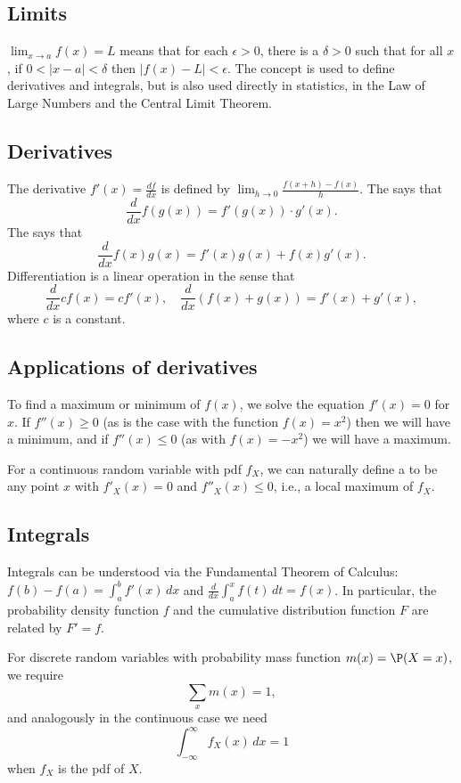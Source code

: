\label{calculus}

\subsection{Limits}

$\lim_{x\to a}f(x)=L$ means that for each $\epsilon>0$, there is a $\delta>0$ such that for all $x$, if $0<|x-a|<\delta$ then $|f(x)-L|<\epsilon$.
The concept is used to define derivatives and integrals, but is also used directly in statistics, in the Law of Large Numbers and the Central Limit Theorem.

\subsection{Derivatives}

	The derivative $f'(x)=\frac{df}{dx}$ is defined by $\lim_{h\to 0}\frac{f(x+h)-f(x)}h$. The  says that
	\[
		\frac{d}{dx}f(g(x))=f'(g(x))\cdot g'(x).
	\]
	The  says that
	\[
		\frac{d}{dx} f(x)g(x) = f'(x)g(x)+f(x)g'(x).
	\]
	Differentiation is a linear operation in the sense that
	\[
		\frac{d}{dx} cf(x)=cf'(x),\quad \frac{d}{dx}(f(x)+g(x)) = f'(x)+g'(x),
	\]
	where $c$ is a constant.

\subsection{Applications of derivatives}%

	To find a maximum or minimum of $f(x)$, we solve the equation $f'(x)=0$ for $x$.
	If $f''(x)\ge 0$ (as is the case with the function $f(x)=x^2$) then we will have a minimum,
	and if $f''(x)\le 0$ (as with $f(x)=-x^2$) we will have a maximum.

	For a continuous random variable with pdf $f_X$, we can naturally define a  to be
	any point $x$ with $f'_X(x)=0$ and $f''_X(x)\le 0$, i.e., a local maximum of $f_X$.

\subsection{Integrals}
	Integrals can be understood via the Fundamental Theorem of Calculus: $f(b)-f(a)=\int_a^b f'(x)\,dx$ and $\frac{d}{dx}\int_a^x f(t)\,dt=f(x)$. In particular, the probability density function $f$ and the cumulative distribution function $F$ are related by $F'=f$.

	For discrete random variables with probability mass function $m(x)=\P(X=x)$, we require
	\[
	\sum_x m(x)=1,
	\]
	and analogously in the continuous case we need
	\[
	\int_{-\infty}^\infty f_X(x)\,dx=1
	\]
	when $f_X$ is the pdf of $X$.

